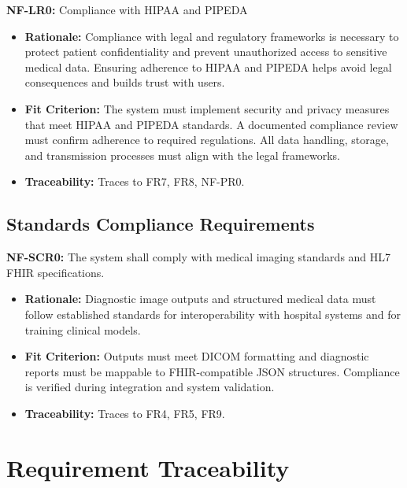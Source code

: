 \documentclass[12pt]{article}
\begin{document}
\textbf{NF-LR0:} Compliance with HIPAA and PIPEDA
\begin{itemize}
    \item \textbf{Rationale:} Compliance with legal and regulatory frameworks is necessary to protect patient confidentiality and prevent unauthorized access to sensitive medical data. Ensuring adherence to HIPAA\cite{hipaa} and PIPEDA\cite{pipeda} helps avoid legal consequences and builds trust with users.
    \item \textbf{Fit Criterion:} The system must implement security and privacy measures that meet HIPAA\cite{hipaa} and PIPEDA\cite{pipeda} standards. A documented compliance review must confirm adherence to required regulations. All data handling, storage, and transmission processes must align with the legal frameworks.
    \item \textbf{Traceability:} Traces to FR7, FR8, NF-PR0.
\end{itemize}

\subsection{Standards Compliance Requirements}

\textbf{NF-SCR0:} The system shall comply with medical imaging standards and HL7 FHIR\cite{fhir} specifications.
\begin{itemize}
    \item \textbf{Rationale:} Diagnostic image outputs and structured medical data must follow established standards for interoperability with hospital systems and for training clinical models.
    \item \textbf{Fit Criterion:} Outputs must meet DICOM\cite{dicom} formatting and diagnostic reports must be mappable to FHIR-compatible JSON structures\cite{fhir}. Compliance is verified during integration and system validation.
    \item \textbf{Traceability:} Traces to FR4, FR5, FR9.
\end{itemize}


\renewcommand{\arraystretch}{1.2}

\section{Requirement Traceability}
\end{document}
